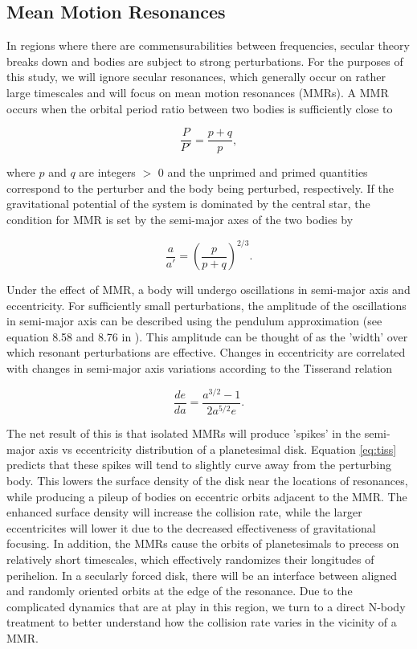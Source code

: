 \documentclass[onecolumn]{aastex63}
\begin{document}
\subsection{Mean Motion Resonances}

In regions where there are commensurabilities between frequencies, secular theory breaks down and bodies are subject to strong 
perturbations. For the purposes of this study, we will ignore secular resonances, which generally occur on rather large timescales 
and will focus on mean motion resonances (MMRs). A MMR occurs  when the orbital period ratio between two bodies is sufficiently 
close to

\begin{equation}\label{eq:per_mmr}
	\frac{P}{P'} = \frac{p + q}{p},
\end{equation}

\noindent where  $p$ and $q$ are integers $>$ 0 and the unprimed and primed quantities correspond to the perturber and the body 
being perturbed, respectively. If the gravitational potential of the system is dominated by the central star, the condition for MMR is set 
by the semi-major axes of the two bodies by

\begin{equation}\label{eq:a_mmr}
	\frac{a}{a'} = \left( \frac{p}{p + q} \right)^{2/3}.
\end{equation}

Under the effect of MMR, a body will undergo oscillations in semi-major axis and eccentricity. For sufficiently small perturbations,
the amplitude of the oscillations in semi-major axis can be 
described using the pendulum approximation (see equation 8.58 and 8.76 in \citet{2000ssd..book.....M}). This amplitude can be thought of 
as the 'width' over which resonant perturbations are effective. Changes in eccentricity are correlated with changes in semi-major axis 
variations according to the Tisserand relation

\begin{equation}\label{eq:tiss}
	\frac{de}{da} = \frac{a^{3/2} - 1}{2 a^{5/2} e}.
\end{equation}

The net result of this is that isolated MMRs will produce 'spikes' in the semi-major axis vs eccentricity distribution of a planetesimal 
disk. Equation \ref{eq:tiss} predicts that these spikes will tend to slightly curve away from the perturbing body. This lowers the surface 
density of the disk near the locations of resonances, while producing a pileup of bodies on eccentric orbits adjacent to the MMR. The 
enhanced surface density will increase the collision rate, while the larger eccentricites will lower it due to the decreased effectiveness of 
gravitational focusing. In addition, the MMRs cause the orbits of planetesimals to precess on relatively short timescales, which effectively 
randomizes their longitudes of perihelion. In a secularly forced disk, there will be an interface between aligned and randomly oriented orbits 
at the edge of the resonance. Due to the complicated dynamics that are at play in this region, we turn to a direct N-body treatment to better 
understand how the collision rate varies in the vicinity of a MMR.
\end{document}
